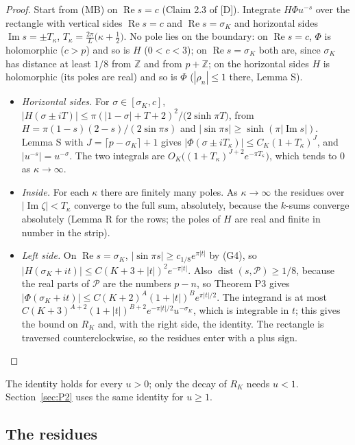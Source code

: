 \documentclass[11pt]{article}
\newcommand{\re}{\operatorname{Re}}
\newcommand{\im}{\operatorname{Im}}
\newcommand{\dist}{\operatorname{dist}}
\begin{document}
\begin{proof}
Start from (MB) on $\re s=c$ (Claim 2.3 of [D]). Integrate $H\Phi u^{-s}$ over the rectangle with vertical sides $\re s=c$ and $\re s=\sigma_K$ and horizontal sides $\im s=\pm T_\kappa$, $T_\kappa=\frac{2\pi}{L}\bigl(\kappa+\frac12\bigr)$. No pole lies on the boundary: on $\re s=c$, $\Phi$ is holomorphic ($c>p$) and so is $H$ ($0<c<3$); on $\re s=\sigma_K$ both are, since $\sigma_K$ has distance at least $1/8$ from $\mathbb{Z}$ and from $p+\mathbb{Z}$; on the horizontal sides $H$ is holomorphic (its poles are real) and so is $\Phi$ ($|\rho_n|\le1$ there, Lemma S).
\begin{itemize}
\item \emph{Horizontal sides.} For $\sigma\in[\sigma_K,c]$, $|H(\sigma\pm iT)|\le\pi(|1-\sigma|+T+2)^2/\bigl(2\sinh\pi T\bigr)$, from $H=\pi(1-s)(2-s)/(2\sin\pi s)$ and $|\sin\pi s|\ge\sinh(\pi|\im s|)$. Lemma S with $J=\lceil p-\sigma_K\rceil+1$ gives $|\Phi(\sigma\pm iT_\kappa)|\le C_K(1+T_\kappa)^J$, and $|u^{-s}|=u^{-\sigma}$. The two integrals are $O_K\bigl((1+T_\kappa)^{J+2}e^{-\pi T_\kappa}\bigr)$, which tends to $0$ as $\kappa\to\infty$.
\item \emph{Inside.} For each $\kappa$ there are finitely many poles. As $\kappa\to\infty$ the residues over $|\im\zeta|<T_\kappa$ converge to the full sum, absolutely, because the $k$-sums converge absolutely (Lemma R for the rows; the poles of $H$ are real and finite in number in the strip).
\item \emph{Left side.} On $\re s=\sigma_K$, $|\sin\pi s|\ge c_{1/8}e^{\pi|t|}$ by (G4), so $|H(\sigma_K+it)|\le C(K+3+|t|)^2e^{-\pi|t|}$. Also $\dist(s,\mathcal{P})\ge1/8$, because the real parts of $\mathcal{P}$ are the numbers $p-n$, so Theorem P3 gives $|\Phi(\sigma_K+it)|\le C(K+2)^A(1+|t|)^Be^{\pi|t|/2}$. The integrand is at most $C(K+3)^{A+2}(1+|t|)^{B+2}e^{-\pi|t|/2}u^{-\sigma_K}$, which is integrable in $t$; this gives the bound on $R_K$ and, with the right side, the identity. The rectangle is traversed counterclockwise, so the residues enter with a plus sign.
\end{itemize}
\end{proof}

The identity holds for every $u>0$; only the decay of $R_K$ needs $u<1$. Section~\ref{sec:P2} uses the same identity for $u\ge1$.

\subsection{The residues}
\end{document}
